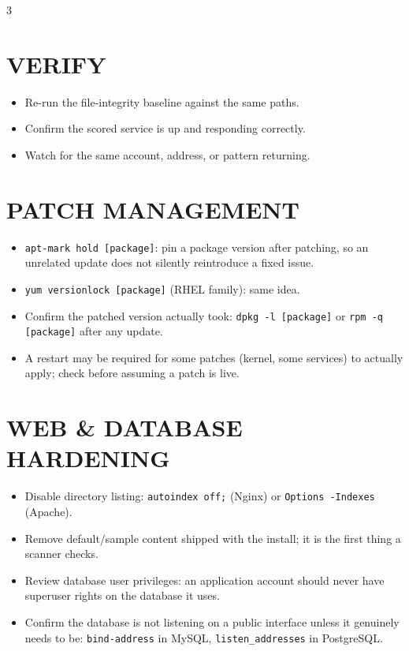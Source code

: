 \documentclass[7pt,landscape]{article}
\begin{document}
\begin{multicols*}{3}
\section{VERIFY}
\begin{itemize}
    \item Re-run the file-integrity baseline against the same paths.
    \item Confirm the scored service is up and responding correctly.
    \item Watch for the same account, address, or pattern returning.
\end{itemize}

\section{PATCH MANAGEMENT}
\begin{itemize}
    \item \texttt{apt-mark hold [package]}: pin a package version after patching, so an unrelated update does not silently reintroduce a fixed issue.
    \item \texttt{yum versionlock [package]} (RHEL family): same idea.
    \item Confirm the patched version actually took: \texttt{dpkg -l [package]} or \texttt{rpm -q [package]} after any update.
    \item A restart may be required for some patches (kernel, some services) to actually apply; check before assuming a patch is live.
\end{itemize}

\section{WEB \& DATABASE HARDENING}
\begin{itemize}
    \item Disable directory listing: \texttt{autoindex off;} (Nginx) or \texttt{Options -Indexes} (Apache).
    \item Remove default/sample content shipped with the install; it is the first thing a scanner checks.
    \item Review database user privileges: an application account should never have superuser rights on the database it uses.
    \item Confirm the database is not listening on a public interface unless it genuinely needs to be: \texttt{bind-address} in MySQL, \texttt{listen\_addresses} in PostgreSQL.
\end{itemize}


\end{multicols*}
\end{document}
